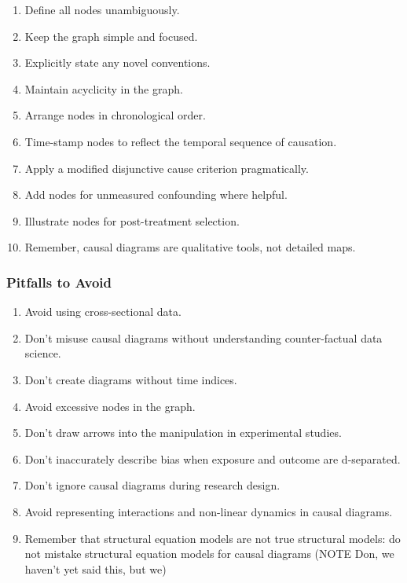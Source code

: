 \documentclass[
  singlecolumn]{article}
\providecommand{\tightlist}{%
  \setlength{\itemsep}{0pt}\setlength{\parskip}{0pt}}\usepackage{longtable,booktabs,array}
\begin{document}
\begin{enumerate}
\def\labelenumi{\arabic{enumi}.}
\tightlist
\item
  Define all nodes unambiguously.
\item
  Keep the graph simple and focused.
\item
  Explicitly state any novel conventions.
\item
  Maintain acyclicity in the graph.
\item
  Arrange nodes in chronological order.
\item
  Time-stamp nodes to reflect the temporal sequence of causation.
\item
  Apply a modified disjunctive cause criterion pragmatically.
\item
  Add nodes for unmeasured confounding where helpful.
\item
  Illustrate nodes for post-treatment selection.
\item
  Remember, causal diagrams are qualitative tools, not detailed maps.
\end{enumerate}

\hypertarget{pitfalls-to-avoid}{%
\subsubsection{Pitfalls to Avoid}\label{pitfalls-to-avoid}}

\begin{enumerate}
\def\labelenumi{\arabic{enumi}.}
\tightlist
\item
  Avoid using cross-sectional data.
\item
  Don't misuse causal diagrams without understanding counter-factual
  data science.
\item
  Don't create diagrams without time indices.
\item
  Avoid excessive nodes in the graph.
\item
  Don't draw arrows into the manipulation in experimental studies.
\item
  Don't inaccurately describe bias when exposure and outcome are
  d-separated.
\item
  Don't ignore causal diagrams during research design.
\item
  Avoid representing interactions and non-linear dynamics in causal
  diagrams.
\item
  Remember that structural equation models are not true structural
  models: do not mistake structural equation models for causal diagrams
  (NOTE Don, we haven't yet said this, but we)
\end{enumerate}
\end{document}
